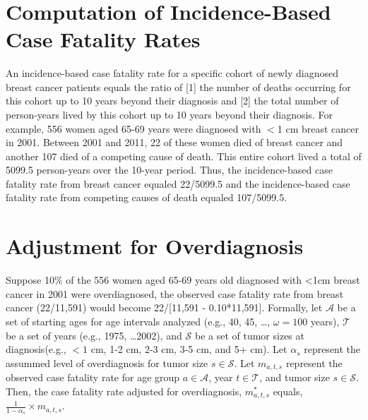 \documentclass[11pt,letterpaper]{article}
\theoremstyle{plain}
\theoremstyle{remark}
\numberwithin{equation}{section}
\begin{document}
\blind \title{\bf \tit} \maketitle \fi


\thispagestyle{empty}
\setcounter{page}{0}



\newpage
\clearpage
 \setcounter{table}{0}  %
 \setcounter{figure}{0}  %
 \setcounter{page}{1}
 \renewcommand{\figurename}{Supplemental Figure}
 \renewcommand{\tablename}{Supplemental Table}
\appendix

\section{Computation of Incidence-Based Case Fatality Rates}
An incidence-based case fatality rate for a specific cohort of newly
diagnosed breast cancer patients equals the ratio of [1] the number of
deaths occurring for this cohort up to 10 years beyond their diagnosis
and [2] the total number of person-years lived by this cohort up to 10
years beyond their diagnosis.  For example, 556 women aged 65-69 years
were diagnosed with $<$1 cm breast cancer in 2001.  Between 2001 and
2011, 22 of these women died of breast cancer and another 107 died of
a competing cause of death.  This entire cohort lived a total of
5099.5 person-years over the 10-year period.  Thus, the
incidence-based case fatality rate from breast cancer equaled
22/5099.5 and the incidence-based case fatality rate from competing
causes of death equaled 107/5099.5.

\section{Adjustment for Overdiagnosis}
Suppose 10\% of the 556 women aged 65-69 years old diagnosed with <1cm
breast cancer in 2001 were overdiagnosed, the observed case fatality
rate from breast cancer (22/11,591) would become 22/[11,591 -
0.10*11,591].  Formally, let $\mathcal{A}$ be a set of starting ages
for age intervals analyzed (e.g., 40, 45, \dots, $\omega=100$ years),
$\mathcal{T}$ be a set of years (e.g., 1975, \dots 2002), and
$\mathcal{S}$ be a set of tumor sizes at diagnosis(e.g., $<1$ cm, 1-2
cm, 2-3 cm, 3-5 cm, and 5+ cm).  Let $\alpha_s$ represent the assummed
level of overdiagnosis for tumor size $s\in\mathcal{S}$.  Let
$m_{a,t,s}$ represent the observed case fatality rate for age group
$a \in \mathcal{A}$, year $t \in \mathcal{T}$, and tumor size
$s \in \mathcal{S}$.  Then, the case fatality rate adjusted for
overdiagnosis, $m^*_{a,t,s}$ equals,
$\frac{1}{1-\alpha_s} \times m_{a,t,s}$.
\end{document}

